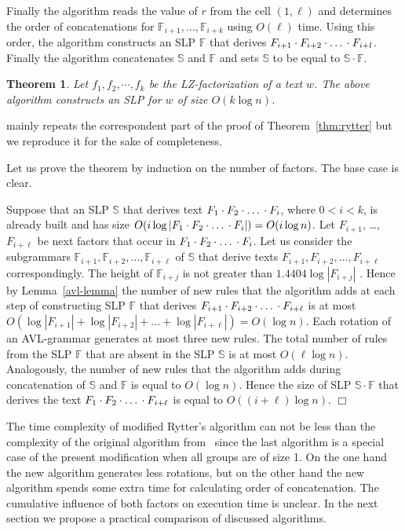 ﻿\documentclass[11pt]{article}
\newtheorem{thm}{Theorem}[section]
\theoremstyle{remark}
\newcommand{\qqed}{\hfill$\Box$}
\newenvironment{proof1}{\trivlist\item[\hskip\labelsep{\bf Proof}] }{\qqed\endtrivlist}
\newcommand{\slp}[1]{\mathbb{#1}}
\newcommand{\tuple}[4]{
    #1_{#2}, #1_{#3}, \dots, #1_{#4}
}
\newcommand{\concat}[4]{
    #1_{#2} \cdot #1_{#3} \cdot \mbox{\dots} \cdot #1_{#4}
}
\begin{document}
Finally the algorithm reads the value of $r$ from the cell $(1,\ell)$ and determines the order of concatenations for
$\slp{F}_{i+1}, \dots, \slp{F}_{i+k}$ using $O(\ell)$ time. Using this order, the algorithm constructs an SLP
$\slp{F}$ that derives $\concat{F}{i+1}{i+2}{i+l}$. Finally the algorithm concatenates $\slp{S}$ and $\slp{F}$ and sets
$\slp{S}$ to be equal to $\slp{S} \cdot \slp{F}$.

\begin{thm}
Let $f_1, f_2, \cdots, f_k$ be the LZ-factorization of a text $w$. The above algorithm constructs an SLP for $w$ of
size $O(k\log n)$.
\end{thm}
\begin{proof1} mainly repeats the correspondent part of the proof of Theorem~\ref{thm:rytter} but we reproduce it for
the sake of completeness.

Let us prove the theorem by induction on the number of factors. The base case is clear.

Suppose that an SLP $\slp{S}$ that derives text $\concat{F}{1}{2}{i}$, where $0 < i < k$, is already built and has size $O(i \log
|\concat{F}{1}{2}{i}|)=O(i \log n)$. Let $F_{i+1}$, \dots, $F_{i+\ell}$ be next factors that occur in
$\concat{F}{1}{2}{i}$. Let us consider the subgrammars $\tuple{\slp{F}}{i+1}{i+2}{i+\ell}$ of $\slp{S}$ that derive texts
$\tuple{F}{i+1}{i+2}{i+\ell}$ correspondingly. The height of $\slp{F}_{i+j}$ is not greater than $1.4404\log|F_{i+j}|$
\cite{Knuth}. Hence by Lemma~\ref{avl-lemma} the number of new rules that the algorithm adds at each step of constructing
SLP $\slp{F}$ that derives $\concat{F}{i+1}{i+2}{i+\ell}$ is at most $O\left(\log |F_{i+1}| + \log |F_{i+2}| + \dots +
\log |F_{i+\ell}|\right)=O(\log n)$. Each rotation of an AVL-grammar generates at most three new rules. The total number of
rules from the SLP $\slp{F}$ that are absent in the SLP $\slp{S}$ is at most $O(\ell\log n)$. Analogously, the number of new rules
that the algorithm adds during concatenation of $\slp{S}$ and $\slp{F}$ is equal to $O(\log n)$. Hence the size of SLP
$\slp{S}\cdot\slp{F}$ that derives the text $\concat{F}{1}{2}{i+\ell}$ is equal to $O((i+\ell)\log n)$.
\end{proof1}

The time complexity of modified Rytter's algorithm can not be less than the complexity of the original algorithm
from~\cite{SLPConstruction} since the last algorithm is a special case of the present modification when all groups
are of size 1. On the one hand the new algorithm generates less rotations, but on the other hand the
new algorithm spends some extra time for calculating order of concatenation. The cumulative influence of both factors on
execution time is unclear. In the next section we propose a practical comparison of discussed algorithms.
\end{document}
